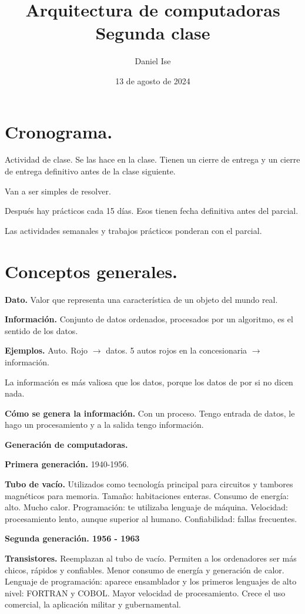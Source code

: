 \documentclass{article}
\title{Arquitectura de computadoras\\Segunda clase}
\author{Daniel Ise}
\date{13 de agosto de 2024}
\begin{document}
\maketitle

\section*{Cronograma.}

Actividad de clase. Se las hace en la clase. Tienen un cierre de entrega y un 
cierre de entrega definitivo antes de la clase siguiente. 

Van a ser simples de resolver.

Después hay prácticos cada 15 días. Esos tienen fecha definitiva antes del 
parcial.

Las actividades semanales y trabajos prácticos ponderan con el parcial.

\section*{Conceptos generales.}

\textbf{Dato.} Valor que representa una característica de un objeto del mundo
real.

\textbf{Información.} Conjunto de datos ordenados, procesados por un algoritmo,
es el sentido de los datos.

\textbf{Ejemplos.} Auto. Rojo $\rightarrow$ datos. 5 autos rojos en la 
concesionaria $\rightarrow$ información.

La información es más valiosa que los datos, porque los datos de por si no 
dicen nada.

\textbf{Cómo se genera la información.} Con un proceso. Tengo entrada de datos,
le hago un procesamiento y a la salida tengo información.

\textbf{Generación de computadoras.}

\textbf{Primera generación.} 1940-1956. 

\textbf{Tubo de vacío.} Utilizados como tecnología principal para circuitos y
tambores magnéticos para memoria. Tamaño: habitaciones enteras. Consumo de 
energía: alto. Mucho calor. Programación: te utilizaba lenguaje de máquina.
Velocidad: procesamiento lento, aunque superior al humano. Confiabilidad: fallas
frecuentes.

\textbf{Segunda generación. 1956 - 1963}

\textbf{Transistores.} Reemplazan al tubo de vacío. Permiten a los ordenadores
ser más chicos, rápidos y confiables. Menor consumo de energía y generación de
calor. Lenguaje de programación: aparece ensamblador y los primeros lenguajes de
alto nivel: FORTRAN y COBOL. Mayor velocidad de procesamiento. Crece el uso 
comercial, la aplicación militar y gubernamental. 
\end{document}

